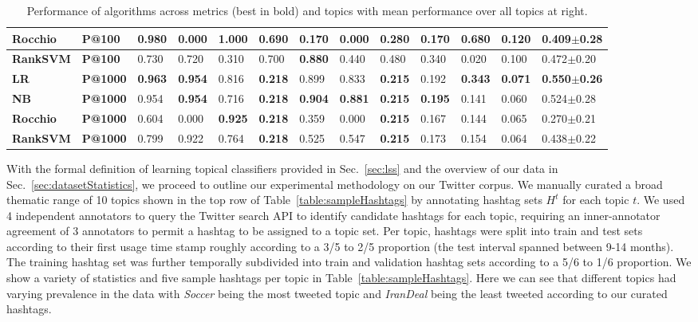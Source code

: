 \documentclass[letterpaper]{article}
\begin{document}
\begin{table}[t!]
{{\begin{tabular}{|l|l|l|l|l|l|l|l|l|l|l|l|l|}
\textbf{Rocchio} & \textbf{P@100} & \textbf{0.980} & 0.000 & \textbf{1.000} & 0.690 & 0.170 & 0.000 & 0.280 & 0.170 & 0.680 & 0.120 & 0.409$\pm$0.28 \\ \hline
\textbf{RankSVM} & \textbf{P@100} & 0.730 & 0.720 & 0.310 & 0.700 & \textbf{0.880} & 0.440 & 0.480 & 0.340 & 0.020 & 0.100 & 0.472$\pm$0.20 \\ \hline \hline
\textbf{LR} & \textbf{P@1000} & \textbf{0.963} & \textbf{0.954} & 0.816 & \textbf{0.218} & 0.899 & 0.833 & \textbf{0.215} & 0.192 & \textbf{0.343} & \textbf{0.071} & \textbf{0.550$\pm$0.26} \\ \hline
\textbf{NB} & \textbf{P@1000} & 0.954 & \textbf{0.954} & 0.716 & \textbf{0.218} & \textbf{0.904} & \textbf{0.881} & \textbf{0.215} & \textbf{0.195} & 0.141 & 0.060 & 0.524$\pm$0.28 \\ \hline
\textbf{Rocchio} & \textbf{P@1000} & 0.604 & 0.000 & \textbf{0.925} & \textbf{0.218} & 0.359 & 0.000 & \textbf{0.215} & 0.167 & 0.144 & 0.065 & 0.270$\pm$0.21 \\ \hline
\textbf{RankSVM} & \textbf{P@1000} & 0.799 & 0.922 & 0.764 & \textbf{0.218} & 0.525 & 0.547 & \textbf{0.215} & 0.173 & 0.154 & 0.064 & 0.438$\pm$0.22 \\ \hline
\end{tabular}
}}
\caption{Performance of algorithms across metrics (best in bold) and topics with 
mean performance over all topics at right.} 
\label{table:results2}
\end{table}

With the formal definition of learning topical classifiers provided
in Sec.~\ref{sec:lss} and the overview of our data in
Sec.~\ref{sec:datasetStatistics}, we proceed to outline our
experimental methodology on our Twitter corpus.  We manually curated a
broad thematic range of 10 topics shown in the top row of
Table~\ref{table:sampleHashtags}
by annotating hashtag sets $H^t$ for each topic $t$.  We used 4
independent annotators to query the Twitter search API to identify
candidate hashtags for each topic, requiring an inner-annotator
agreement of 3 annotators to permit a hashtag to be assigned to a
topic set.  Per topic, hashtags were split into train and test sets
according to their first usage time stamp roughly according to a 3/5
to 2/5 proportion (the test interval spanned between 9-14 months).  
The training hashtag set was further temporally subdivided
into train and validation hashtag sets according to a 5/6 to 1/6
proportion.  We show a variety of statistics and five sample hashtags
per topic in Table~\ref{table:sampleHashtags}.  Here we can see that
different topics had varying prevalence in the data
with \textit{Soccer} being the most tweeted topic
and \textit{IranDeal} being the least tweeted according to our curated
hashtags.
\end{document}
